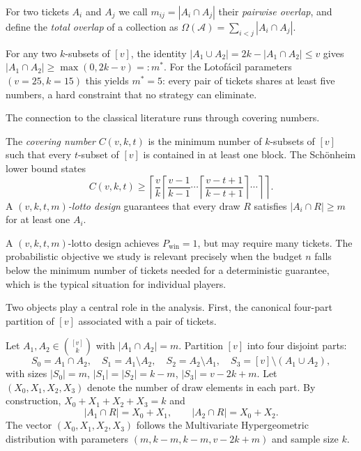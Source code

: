 For two tickets $A_i$ and $A_j$ we call $m_{ij} = |A_i \cap A_j|$ their
\emph{pairwise overlap}, and define the \emph{total overlap} of a collection
as $\Omega(\mathcal{A}) = \sum_{i < j} |A_i \cap A_j|$.

\begin{remark}
  \label{rem:min-overlap}
  For any two $k$-subsets of $[v]$, the identity $|A_1 \cup A_2| = 2k -
  |A_1 \cap A_2| \le v$ gives $|A_1 \cap A_2| \ge \max(0, 2k-v) =: m^*$.
  For the Lotof\'{a}cil parameters $(v=25, k=15)$ this yields $m^* = 5$:
  every pair of tickets shares at least five numbers, a hard constraint
  that no strategy can eliminate.
\end{remark}

The connection to the classical literature runs through covering numbers.

\begin{definition}
  \label{def:covering}
  The \emph{covering number} $C(v,k,t)$ is the minimum number of $k$-subsets
  of $[v]$ such that every $t$-subset of $[v]$ is contained in at least one
  block.  The Sch\"{o}nheim lower bound \cite{Schoenheim1964} states
  \begin{equation}
    \label{eq:schoenheim}
    C(v,k,t)
    \ge \left\lceil \frac{v}{k}
        \left\lceil \frac{v-1}{k-1}
        \cdots
        \left\lceil \frac{v-t+1}{k-t+1}
        \right\rceil \cdots \right\rceil \right\rceil.
  \end{equation}
  A \emph{$(v,k,t,m)$-lotto design} \cite{Li2002} guarantees that every draw
  $R$ satisfies $|A_i \cap R| \ge m$ for at least one $A_i$.
\end{definition}

A $(v,k,t,m)$-lotto design achieves $P_{\mathrm{win}} = 1$, but may require
many tickets.  The probabilistic objective we study is relevant precisely when
the budget $n$ falls below the minimum number of tickets needed for a
deterministic guarantee, which is the typical situation for individual players.

Two objects play a central role in the analysis.  First, the canonical
four-part partition of $[v]$ associated with a pair of tickets.

\begin{definition}
  \label{def:partition}
  Let $A_1, A_2 \in \binom{[v]}{k}$ with $|A_1 \cap A_2| = m$.  Partition
  $[v]$ into four disjoint parts:
  \[
    S_0 = A_1 \cap A_2, \quad
    S_1 = A_1 \setminus A_2, \quad
    S_2 = A_2 \setminus A_1, \quad
    S_3 = [v] \setminus (A_1 \cup A_2),
  \]
  with sizes $|S_0|=m$, $|S_1|=|S_2|=k-m$, $|S_3|=v-2k+m$.  Let
  $(X_0, X_1, X_2, X_3)$ denote the number of draw elements in each part.
  By construction, $X_0+X_1+X_2+X_3 = k$ and
  \begin{equation}
    \label{eq:scores-partition}
    |A_1 \cap R| = X_0 + X_1, \qquad |A_2 \cap R| = X_0 + X_2.
  \end{equation}
  The vector $(X_0,X_1,X_2,X_3)$ follows the Multivariate Hypergeometric
  distribution with parameters $(m, k-m, k-m, v-2k+m)$ and sample size $k$.
\end{definition}


